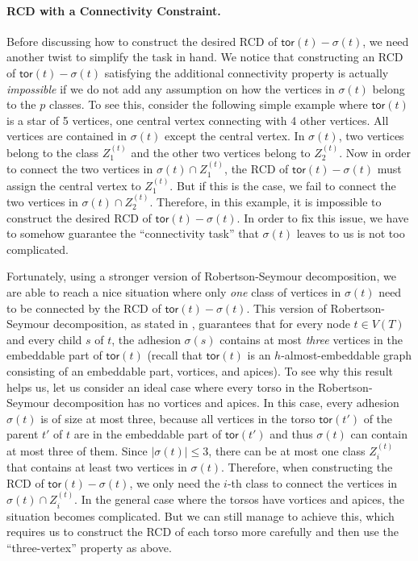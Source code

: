 \documentclass[a4paper,11pt]{article}
\numberwithin{lemma}{section}
\newcommand{\tor}{\mathsf{tor}}
\begin{document}
\paragraph{RCD with a Connectivity Constraint.}
Before discussing how to construct the desired RCD of $\tor(t) - \sigma(t)$, we need another twist to simplify the task in hand.
We notice that constructing an RCD of $\tor(t) - \sigma(t)$ satisfying the additional connectivity property is actually \emph{impossible} if we do not add any assumption on how the vertices in $\sigma(t)$ belong to the $p$ classes.
To see this, consider the following simple example where $\tor(t)$ is a star of 5 vertices, one central vertex connecting with 4 other vertices.
All vertices are contained in $\sigma(t)$ except the central vertex.
In $\sigma(t)$, two vertices belong to the class $Z_1^{(t)}$ and the other two vertices belong to $Z_2^{(t)}$.
Now in order to connect the two vertices in $\sigma(t) \cap Z_1^{(t)}$, the RCD of $\tor(t) - \sigma(t)$ must assign the central vertex to $Z_1^{(t)}$.
But if this is the case, we fail to connect the two vertices in $\sigma(t) \cap Z_2^{(t)}$.
Therefore, in this example, it is impossible to construct the desired RCD of $\tor(t) - \sigma(t)$.
In order to fix this issue, we have to somehow guarantee the ``connectivity task'' that $\sigma(t)$ leaves to us is not too complicated.

Fortunately, using a stronger version of Robertson-Seymour decomposition, we are able to reach a nice situation where only \emph{one} class of vertices in $\sigma(t)$ need to be connected by the RCD of $\tor(t) - \sigma(t)$.
This version of Robertson-Seymour decomposition, as stated in \cite{DemaineHK05,DeVosDOSRSV04}, guarantees that for every node $t \in V(T)$ and every child $s$ of $t$, the adhesion $\sigma(s)$ contains at most \emph{three} vertices in the embeddable part of $\tor(t)$ (recall that $\tor(t)$ is an $h$-almost-embeddable graph consisting of an embeddable part, vortices, and apices).
To see why this result helps us, let us consider an ideal case where every torso in the Robertson-Seymour decomposition has no vortices and apices.
In this case, every adhesion $\sigma(t)$ is of size at most three, because all vertices in the torso $\tor(t')$ of the parent $t'$ of $t$ are in the embeddable part of $\tor(t')$ and thus $\sigma(t)$ can contain at most three of them.
Since $|\sigma(t)| \leq 3$, there can be at most one class $Z_i^{(t)}$ that contains at least two vertices in $\sigma(t)$.
Therefore, when constructing the RCD of $\tor(t) - \sigma(t)$, we only need the $i$-th class to connect the vertices in $\sigma(t) \cap Z_i^{(t)}$.
In the general case where the torsos have vortices and apices, the situation becomes complicated.
But we can still manage to achieve this, which requires us to construct the RCD of each torso more carefully and then use the ``three-vertex'' property as above.
\end{document}
